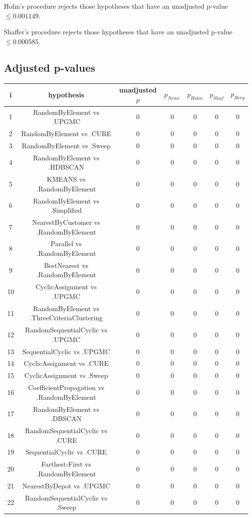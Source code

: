 \documentclass[a4paper,10pt]{article}
\begin{document}
\begin{landscape}
Holm's procedure rejects those hypotheses that have an unadjusted p-value $\le0.001149$.

Shaffer's procedure rejects those hypotheses that have an unadjusted p-value $\le0.000585$.

\pagebreak

\subsection{Adjusted p-values}

\begin{table}[!htp]
\centering\scriptsize
\begin{tabular}{ccccccc}
i&hypothesis&unadjusted $p$&$p_{Neme}$&$p_{Holm}$&$p_{Shaf}$&$p_{Berg}$\\
\hline1&RandomByElement vs .UPGMC&0&0&0&0&0\\
2&RandomByElement vs .CURE&0&0&0&0&0\\
3&RandomByElement vs .Sweep&0&0&0&0&0\\
4&RandomByElement vs .HDBSCAN&0&0&0&0&0\\
5&KMEANS vs .RandomByElement&0&0&0&0&0\\
6&RandomByElement vs .Simplified&0&0&0&0&0\\
7&NearestByCustomer vs .RandomByElement&0&0&0&0&0\\
8&Parallel vs .RandomByElement&0&0&0&0&0\\
9&BestNearest vs .RandomByElement&0&0&0&0&0\\
10&CyclicAssignment vs .UPGMC&0&0&0&0&0\\
11&RandomByElement vs .ThreeCriteriaClustering&0&0&0&0&0\\
12&RandomSequentialCyclic vs .UPGMC&0&0&0&0&0\\
13&SequentialCyclic vs .UPGMC&0&0&0&0&0\\
14&CyclicAssignment vs .CURE&0&0&0&0&0\\
15&CyclicAssignment vs .Sweep&0&0&0&0&0\\
16&CoefficientPropagation vs .RandomByElement&0&0&0&0&0\\
17&RandomByElement vs .DBSCAN&0&0&0&0&0\\
18&RandomSequentialCyclic vs .CURE&0&0&0&0&0\\
19&SequentialCyclic vs .CURE&0&0&0&0&0\\
20&Farthest-First vs .RandomByElement&0&0&0&0&0\\
21&NearestByDepot vs .UPGMC&0&0&0&0&0\\
22&RandomSequentialCyclic vs .Sweep&0&0&0&0&0\\

\end{tabular}
\end{table}
\end{landscape}
\end{document}
